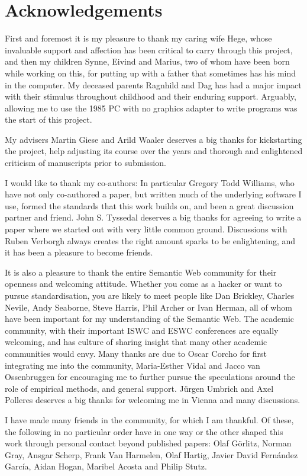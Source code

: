 \section*{Acknowledgements}

First and foremost it is my pleasure to thank my caring wife Hege,
whose invaluable support and affection has been critical to carry
through this project, and then my children Synne, Eivind and Marius,
two of whom have been born while working on this, for putting up with
a father that sometimes has his mind in the computer. My deceased
parents Ragnhild and Dag has had a major impact with their stimulus
throughout childhood and their enduring support. Arguably, allowing me
to use the 1985 PC with no graphics adapter to write programs was the
start of this project.

My advisers Martin Giese and Arild Waaler deserves a big thanks for
kickstarting the project, help adjusting its course over the years and
thorough and enlightened criticism of manuscripts prior to submission.

I would like to thank my co-authors: In particular Gregory Todd
Williams, who have not only co-authored a paper, but written much of
the underlying software I use, formed the standards that this work
builds on, and been a great discussion partner and friend. John
S. Tyssedal deserves a big thanks for agreeing to write a paper where
we started out with very little common ground. Discussions with Ruben
Verborgh always creates the right amount sparks to be enlightening,
and it has been a pleasure to become friends.

It is also a pleasure to thank the entire Semantic Web community for
their openness and welcoming attitude. Whether you come as a hacker
or want to pursue standardisation, you are likely to meet people like
Dan Brickley, Charles Nevile, Andy Seaborne, Steve Harris, Phil Archer
or Ivan Herman, all of whom have been important for my understanding
of the Semantic Web. The academic community, with their important ISWC
and ESWC conferences are equally welcoming, and has culture of sharing
insight that many other academic communities would envy. Many thanks
are due to Oscar Corcho for first integrating me into the community,
Maria-Esther Vidal and Jacco van Ossenbruggen for encouraging me to
further pursue the speculations around the role of empirical methods,
and general support. Jürgen Umbrich and Axel Polleres deserves a big
thanks for welcoming me in Vienna and many discussions.

I have made many friends in the community, for which I am thankful. Of
these, the following in no particular order have in one way or the
other shaped this work through personal contact beyond published
papers: Olaf Görlitz, Norman Gray, Ansgar Scherp, Frank Van Harmelen,
Olaf Hartig, Javier David Fernández García, Aidan Hogan, Maribel
Acosta and Philip Stutz.

